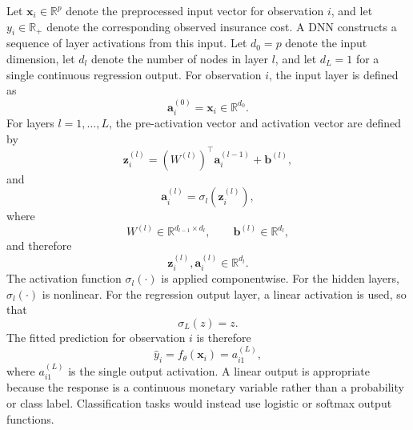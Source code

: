 \noindent
Let \(\mathbf{x}_i\in\mathbb{R}^{p}\) denote the preprocessed input vector for
observation \(i\), and let \(y_i\in\mathbb{R}_{+}\) denote the corresponding
observed insurance cost. A DNN constructs a sequence of
layer activations from this input. Let \(d_0=p\) denote the input dimension, let
\(d_l\) denote the number of nodes in layer \(l\), and let \(d_L=1\) for a
single continuous regression output. For observation \(i\), the input layer is
defined as
\begin{equation}
\label{eq:input_layer}
    \mathbf{a}^{(0)}_i
    =
    \mathbf{x}_i
    \in
    \mathbb{R}^{d_0}.
\end{equation}
For layers \(l=1,\ldots,L\), the pre-activation vector and activation vector are
defined by
\begin{equation}
\label{eq:pre_activation}
    \mathbf{z}^{(l)}_i
    =
    \left(W^{(l)}\right)^{\top}
    \mathbf{a}^{(l-1)}_i
    +
    \mathbf{b}^{(l)},
\end{equation}
and
\begin{equation}
\label{eq:activation}
    \mathbf{a}^{(l)}_i
    =
    \sigma_l
    \!\left(
        \mathbf{z}^{(l)}_i
    \right),
\end{equation}
where
\[
    W^{(l)}
    \in
    \mathbb{R}^{d_{l-1}\times d_l},
    \qquad
    \mathbf{b}^{(l)}
    \in
    \mathbb{R}^{d_l},
\]
and therefore
\[
    \mathbf{z}^{(l)}_i,
    \mathbf{a}^{(l)}_i
    \in
    \mathbb{R}^{d_l}.
\]
The activation function \(\sigma_l(\cdot)\) is applied componentwise. For the
hidden layers, \(\sigma_l(\cdot)\) is nonlinear. For the regression output
layer, a linear activation is used, so that
\[
    \sigma_L(z)=z.
\]
The fitted prediction for observation \(i\) is therefore
\begin{equation}
\label{eq:dnn_prediction}
    \widehat{y}_i
    =
    f_{\theta}(\mathbf{x}_i)
    =
    a^{(L)}_{i1},
\end{equation}
where \(a^{(L)}_{i1}\) is the single output activation. A linear output is
appropriate because the response is a continuous monetary variable rather than a
probability or class label. Classification tasks would instead use logistic or
softmax output functions.

